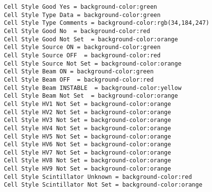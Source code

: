 {\begin{lstlisting}[breaklines=true,basicstyle=\tiny,postbreak=\mbox{\textcolor{red}{$\hookrightarrow$}\space},]
Cell Style Good Yes = background-color:green
Cell Style Type Data = background-color:green
Cell Style Type Comments = background-color:rgb(34,184,247)
Cell Style Good No  = background-color:red
Cell Style Good Not Set  = background-color:orange
Cell Style Source ON = background-color:green
Cell Style Source OFF  = background-color:red
Cell Style Source Not Set = background-color:orange
Cell Style Beam ON = background-color:green
Cell Style Beam OFF  = background-color:red
Cell Style Beam INSTABLE  = background-color:yellow
Cell Style Beam Not Set  = background-color:orange
Cell Style HV1 Not Set = background-color:orange
Cell Style HV2 Not Set = background-color:orange
Cell Style HV3 Not Set = background-color:orange
Cell Style HV4 Not Set = background-color:orange
Cell Style HV5 Not Set = background-color:orange
Cell Style HV6 Not Set = background-color:orange
Cell Style HV7 Not Set = background-color:orange
Cell Style HV8 Not Set = background-color:orange
Cell Style HV9 Not Set = background-color:orange
Cell Style Scintillator Unknown = background-color:red
Cell Style Scintillator Not Set = background-color:orange


\end{lstlisting}}

